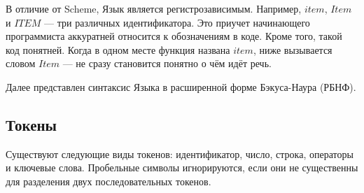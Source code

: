         В отличие от Scheme, Язык является регистрозависимым.
        Например, $item$, $Item$ и $ITEM$ --- три различных идентификатора.
        Это приучет начинающего программиста аккуратней относится к обозначениям в коде.
        Кроме того, такой код понятней.
        Когда в одном месте функция названа $item$, ниже вызывается словом $Item$ --- не сразу становится понятно о чём идёт речь.

        Далее представлен синтаксис Языка в расширенной форме Бэкуса-Наура (РБНФ)\cite{skor}.

    \clearpage
    \subsection{Токены}
        Существуют следующие виды токенов: идентификатор, число, строка, операторы и ключевые слова.
        Пробельные символы игнорируются, если они не существенны для разделения двух последовательных токенов.

